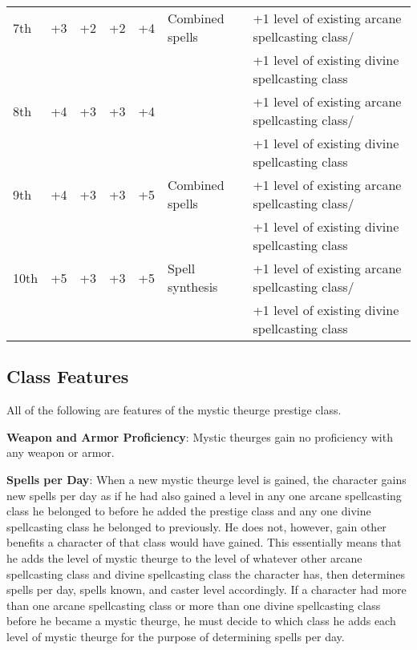 \begin{table}[]
\begin{tabular}{lllllll}
7th & +3 & +2 & +2 & +4 & Combined spells & +1 level of existing arcane spellcasting class/\\
    &    &    &    &    &                 & +1 level of existing divine spellcasting class\\
8th & +4 & +3 & +3 & +4 &  & +1 level of existing arcane spellcasting class/\\
    &    &    &    &    &                 & +1 level of existing divine spellcasting class\\
9th & +4 & +3 & +3 & +5 & Combined spells & +1 level of existing arcane spellcasting class/\\
    &    &    &    &    &                 & +1 level of existing divine spellcasting class\\
10th & +5 & +3 & +3 & +5 & Spell synthesis & +1 level of existing arcane spellcasting class/\\
    &    &    &    &    &                 & +1 level of existing divine spellcasting class\\
\end{tabular}
\end{table}
				
\subsection{Class Features}

				
All of the following are features of the mystic theurge prestige class.
				
\textbf{Weapon and Armor Proficiency}: Mystic theurges gain no proficiency with any weapon or armor.
				
\textbf{Spells per Day}: When a new mystic theurge level is gained, the character gains new spells per day as if he had also gained a level in any one arcane spellcasting class he belonged to before he added the prestige class and any one divine spellcasting class he belonged to previously. He does not, however, gain other benefits a character of that class would have gained. This essentially means that he adds the level of mystic theurge to the level of whatever other arcane spellcasting class and divine spellcasting class the character has, then determines spells per day, spells known, and caster level accordingly. If a character had more than one arcane spellcasting class or more than one divine spellcasting class before he became a mystic theurge, he must decide to which class he adds each level of mystic theurge for the purpose of determining spells per day.
				
